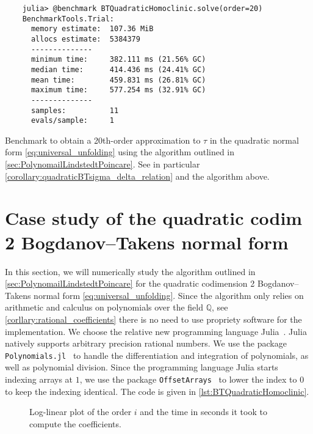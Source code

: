 \begin{table}[h]
    \centering
    \begin{verbatim}
    julia> @benchmark BTQuadraticHomoclinic.solve(order=20)
    BenchmarkTools.Trial:
      memory estimate:  107.36 MiB
      allocs estimate:  5384379
      --------------
      minimum time:     382.111 ms (21.56% GC)
      median time:      414.436 ms (24.41% GC)
      mean time:        459.831 ms (26.81% GC)
      maximum time:     577.254 ms (32.91% GC)
      --------------
      samples:          11
      evals/sample:     1
    \end{verbatim}
    \caption{Benchmark to obtain a 20th-order approximation to $\tau$ in the
    quadratic normal form \cref{eq:universal_unfolding} using the algorithm
    outlined in \cref{sec:PolynomailLindstedtPoincare}. See in particular
    \cref{corollary:quadraticBTsigma_delta_relation} and the algorithm above.}
    \label{tab:benchmark}
\end{table}
\section{Case study of the quadratic codim 2 Bogdanov--Takens normal form}
\label{sec:case_study_BT2}
In this section, we will numerically study the algorithm outlined in
\cref{sec:PolynomailLindstedtPoincare} for the quadratic codimension 2
Bogdanov--Takens normal form \cref{eq:universal_unfolding}.  Since the algorithm
only relies on arithmetic and calculus on polynomials over the field $\mathbb
Q$, see \cref{corllary:rational_coefficients} there is no need to use propriety
software for the implementation. We choose the relative new programming
language Julia~\cite{bezanson2017julia}. Julia natively supports arbitrary
precision rational numbers. We use the package
\texttt{Polynomials.jl}~\cite{Polynomials} to handle the
differentiation and integration of polynomials, as well as polynomial division.
Since the programming language Julia starts indexing arrays at $1$, we use the
package \texttt{OffsetArrays}~\cite{OffsetArrays} to lower the index
to $0$ to keep the indexing identical. The code is given in \cref{lst:BTQuadraticHomoclinic}.

\begin{figure}
\centering
{}
\caption{Log-linear plot of the order $i$ and the time in seconds it took to
compute the coefficients.}
\label{fig:BTQuadraticNormalFormTimings}
\end{figure}

